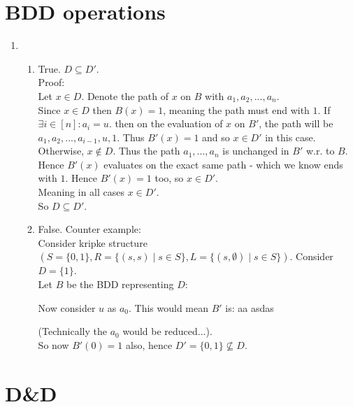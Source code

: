 \documentclass{article}
\begin{document}
\section{BDD operations}
\begin{enumerate}[label=\textbf{\alph*.}]
\item
    \begin{enumerate}[label=\textbf{\arabic*.}]
    \item True. $D\subseteq D'$.\\
        Proof:\\
        Let $x\in D$. Denote the path of $x$ on $B$ with $a_1,a_2,...,a_n$.\\
        Since $x\in D$ then $B(x)=1$, meaning the path must end with $1$.
        If $\exists i\in[n]: a_i=u$.
        then on the evaluation of $x$ on $B'$,
        the path will be $a_1,a_2,...,a_{i-1},u,1$.
        Thus $B'(x)=1$ and so $x\in D'$ in this case.\\
        Otherwise, $x\notin D$. Thus the path $a_1,...,a_n$ is
        unchanged in $B'$ w.r. to $B$. Hence $B'(x)$ evaluates
        on the exact same path - which we know ends with $1$.
        Hence $B'(x)=1$ too, so $x\in D'$.\\
        Meaning in all cases $x\in D'$.\\
        So $D\subseteq D'$.
    \item False. %
        Counter example:\\
        Consider kripke structure $(S=\{0,1\},R=\{(s,s)\mid s\in S\},L=\{(s,\emptyset)\mid s\in S\})$.
        Consider $D=\{1\}$.\\
        Let $B$ be the BDD representing $D$:\\
        \begin{center}\end{center}
        Now consider $u$ as $a_0$. This would mean $B'$ is: aa asdas
        \begin{center}\end{center}
        (Technically the $a_0$ would be reduced...).\\
        So now $B'(0)=1$ also, hence $D'=\{0,1\}\not\subseteq D$.
    \end{enumerate}

\end{enumerate}


\section{D\&D}
\end{document}
